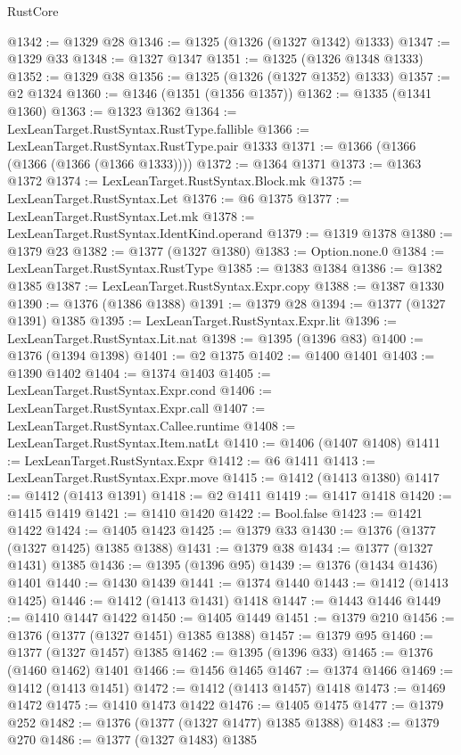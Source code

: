 \begin{lexlean}{RustCore}
\begin{coremodule}
@1342 := @1329 @28
@1346 := @1325 (@1326 (@1327 @1342) @1333)
@1347 := @1329 @33
@1348 := @1327 @1347
@1351 := @1325 (@1326 @1348 @1333)
@1352 := @1329 @38
@1356 := @1325 (@1326 (@1327 @1352) @1333)
@1357 := @2 @1324
@1360 := @1346 (@1351 (@1356 @1357))
@1362 := @1335 (@1341 @1360)
@1363 := @1323 @1362
@1364 := LexLeanTarget.RustSyntax.RustType.fallible
@1366 := LexLeanTarget.RustSyntax.RustType.pair @1333
@1371 := @1366 (@1366 (@1366 (@1366 (@1366 @1333))))
@1372 := @1364 @1371
@1373 := @1363 @1372
@1374 := LexLeanTarget.RustSyntax.Block.mk
@1375 := LexLeanTarget.RustSyntax.Let
@1376 := @6 @1375
@1377 := LexLeanTarget.RustSyntax.Let.mk
@1378 := LexLeanTarget.RustSyntax.IdentKind.operand
@1379 := @1319 @1378
@1380 := @1379 @23
@1382 := @1377 (@1327 @1380)
@1383 := Option.none.{0}
@1384 := LexLeanTarget.RustSyntax.RustType
@1385 := @1383 @1384
@1386 := @1382 @1385
@1387 := LexLeanTarget.RustSyntax.Expr.copy
@1388 := @1387 @1330
@1390 := @1376 (@1386 @1388)
@1391 := @1379 @28
@1394 := @1377 (@1327 @1391) @1385
@1395 := LexLeanTarget.RustSyntax.Expr.lit
@1396 := LexLeanTarget.RustSyntax.Lit.nat
@1398 := @1395 (@1396 @83)
@1400 := @1376 (@1394 @1398)
@1401 := @2 @1375
@1402 := @1400 @1401
@1403 := @1390 @1402
@1404 := @1374 @1403
@1405 := LexLeanTarget.RustSyntax.Expr.cond
@1406 := LexLeanTarget.RustSyntax.Expr.call
@1407 := LexLeanTarget.RustSyntax.Callee.runtime
@1408 := LexLeanTarget.RustSyntax.Item.natLt
@1410 := @1406 (@1407 @1408)
@1411 := LexLeanTarget.RustSyntax.Expr
@1412 := @6 @1411
@1413 := LexLeanTarget.RustSyntax.Expr.move
@1415 := @1412 (@1413 @1380)
@1417 := @1412 (@1413 @1391)
@1418 := @2 @1411
@1419 := @1417 @1418
@1420 := @1415 @1419
@1421 := @1410 @1420
@1422 := Bool.false
@1423 := @1421 @1422
@1424 := @1405 @1423
@1425 := @1379 @33
@1430 := @1376 (@1377 (@1327 @1425) @1385 @1388)
@1431 := @1379 @38
@1434 := @1377 (@1327 @1431) @1385
@1436 := @1395 (@1396 @95)
@1439 := @1376 (@1434 @1436) @1401
@1440 := @1430 @1439
@1441 := @1374 @1440
@1443 := @1412 (@1413 @1425)
@1446 := @1412 (@1413 @1431) @1418
@1447 := @1443 @1446
@1449 := @1410 @1447 @1422
@1450 := @1405 @1449
@1451 := @1379 @210
@1456 := @1376 (@1377 (@1327 @1451) @1385 @1388)
@1457 := @1379 @95
@1460 := @1377 (@1327 @1457) @1385
@1462 := @1395 (@1396 @33)
@1465 := @1376 (@1460 @1462) @1401
@1466 := @1456 @1465
@1467 := @1374 @1466
@1469 := @1412 (@1413 @1451)
@1472 := @1412 (@1413 @1457) @1418
@1473 := @1469 @1472
@1475 := @1410 @1473 @1422
@1476 := @1405 @1475
@1477 := @1379 @252
@1482 := @1376 (@1377 (@1327 @1477) @1385 @1388)
@1483 := @1379 @270
@1486 := @1377 (@1327 @1483) @1385

\end{coremodule}
\end{lexlean}
